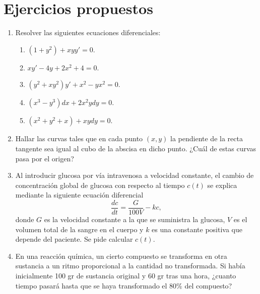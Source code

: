 \section{Ejercicios propuestos}
\begin{enumerate}[leftmargin=*]

\item Resolver las siguientes ecuaciones diferenciales:
\begin{enumerate}
\item $(1+y^{2})+xyy'=0$.
\item $xy'-4y+2x^2+4=0$.
\item $(y^{2}+xy^{2})y'+x^{2}-yx^{2}=0$.
\item $(x^3-y^3)dx+2x^2ydy=0$.
\item $(x^2+y^2+x)+xydy=0$.
\end{enumerate}

\item Hallar las curvas tales que en cada punto $(x,y)$ la pendiente de la recta tangente sea igual al cubo de la
abscisa en dicho punto. 
¿Cuál de estas curvas pasa por el origen?

\item Al introducir glucosa por vía intravenosa a velocidad constante, el cambio de concentración global de glucosa con
respecto al tiempo $c(t)$ se explica mediante la siguiente ecuación diferencial
\[
\frac{dc}{dt}=\frac{G}{100V}-kc,
\]
donde $G$ es la velocidad constante a la que se suministra la glucosa, $V$ es el volumen total de la sangre en el cuerpo y $k$ es una constante positiva que depende del paciente. Se pide calcular $c(t)$.

\item En una reacción química, un cierto compuesto se transforma en otra sustancia a un ritmo proporcional a la cantidad
no transformada. 
Si había inicialmente 100 gr de sustancia original y 60 gr tras una hora, ¿cuanto tiempo pasará hasta
que se haya transformado el 80\% del compuesto?
\end{enumerate}


